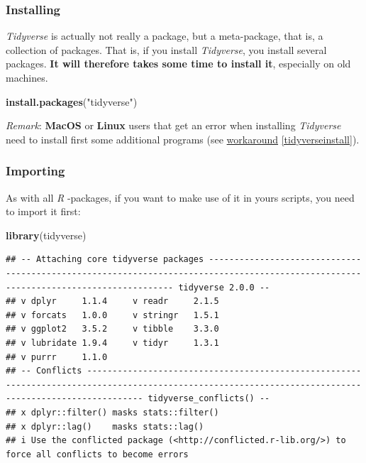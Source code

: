 \documentclass[
]{scrartcl}
\newenvironment{Shaded}{\begin{snugshade}}{\end{snugshade}}
\newcommand{\FunctionTok}[1]{\textcolor[rgb]{0.13,0.29,0.53}{\textbf{#1}}}
\newcommand{\NormalTok}[1]{#1}
\newcommand{\StringTok}[1]{\textcolor[rgb]{0.31,0.60,0.02}{#1}}
\begin{document}
\subsubsection*{Installing}\label{installing}

\emph{Tidyverse} is actually not really a package, but a meta-package, that is, a collection of packages. That is, if you install \emph{Tidyverse}, you install several packages. \textbf{It will therefore takes some time to install it}, especially on old machines.

\begin{Shaded}
\begin{Highlighting}[]
\FunctionTok{install.packages}\NormalTok{(}\StringTok{"tidyverse"}\NormalTok{)}
\end{Highlighting}
\end{Shaded}

\emph{Remark}: \textbf{MacOS} or \textbf{Linux} users that get an error when installing \emph{Tidyverse} need to install first some additional programs (see \hyperref[tidyverseinstall]{workaround} \ref{tidyverseinstall}).

\subsubsection*{Importing}\label{importing}

As with all \emph{R} -packages, if you want to make use of it in yours scripts, you need to import it first:

\begin{Shaded}
\begin{Highlighting}[]
\FunctionTok{library}\NormalTok{(tidyverse)}
\end{Highlighting}
\end{Shaded}

\begin{verbatim}
## -- Attaching core tidyverse packages ------------------------------------------------------------------------------------------------------------------------------------- tidyverse 2.0.0 --
## v dplyr     1.1.4     v readr     2.1.5
## v forcats   1.0.0     v stringr   1.5.1
## v ggplot2   3.5.2     v tibble    3.3.0
## v lubridate 1.9.4     v tidyr     1.3.1
## v purrr     1.1.0     
## -- Conflicts ------------------------------------------------------------------------------------------------------------------------------------------------------- tidyverse_conflicts() --
## x dplyr::filter() masks stats::filter()
## x dplyr::lag()    masks stats::lag()
## i Use the conflicted package (<http://conflicted.r-lib.org/>) to force all conflicts to become errors
\end{verbatim}
\end{document}

